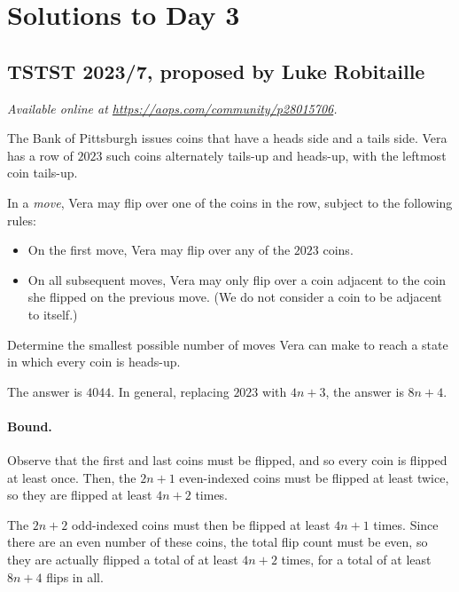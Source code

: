 \documentclass[11pt]{scrartcl}
\begin{document}
\section{Solutions to Day 3}
\subsection{TSTST 2023/7, proposed by Luke Robitaille}
\textsl{Available online at \url{https://aops.com/community/p28015706}.}
\begin{mdframed}[style=mdpurplebox,frametitle={Problem statement}]
The Bank of Pittsburgh issues coins that have a heads side and a tails side.
Vera has a row of $2023$ such coins alternately tails-up and heads-up,
with the leftmost coin tails-up.

In a \emph{move}, Vera may flip over one of the coins in the row,
subject to the following rules:
\begin{itemize}
  \item On the first move, Vera may flip over any of the $2023$ coins.
  \item On all subsequent moves, Vera may only flip over
    a coin adjacent to the coin she flipped on the previous move.
  (We do not consider a coin to be adjacent to itself.)
\end{itemize}
Determine the smallest possible number of moves Vera can
make to reach a state in which every coin is heads-up.
\end{mdframed}
The answer is $\boxed{4044}$.
In general, replacing $2023$ with $4n+3$, the answer is $8n+4$.

\paragraph{Bound.}
Observe that the first and last coins must be flipped,
and so every coin is flipped at least once.
Then, the $2n+1$ even-indexed coins must be flipped at least twice,
so they are flipped at least $4n+2$ times.

The $2n+2$ odd-indexed coins must then be flipped at least $4n+1$ times.
Since there are an even number of these coins,
the total flip count must be even,
so they are actually flipped a total of at least $4n+2$ times,
for a total of at least $8n+4$ flips in all.
\end{document}
